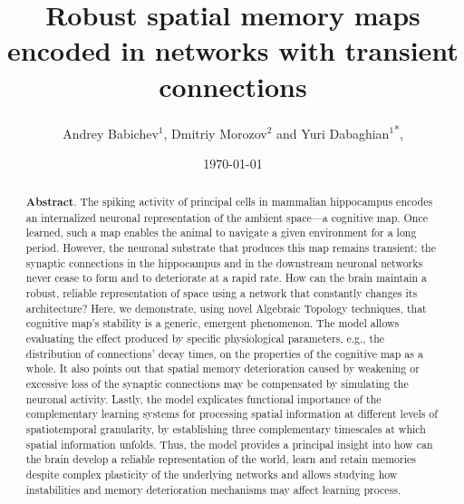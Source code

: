 \documentclass[12pt,tightenlines]{revtex4}
\begin{document}
\title{Robust spatial memory maps encoded in networks with transient connections}
\author{Andrey Babichev$^{1}$, Dmitriy Morozov$^{2}$ and Yuri Dabaghian$^{1}$\textsuperscript{*},}
\date{\today}

\begin{abstract} 
\vspace{10 mm}

\textbf{Abstract}. The spiking activity of principal cells in mammalian hippocampus encodes an internalized 
neuronal representation of the ambient space---a cognitive map. Once learned, such a map enables the animal 
to navigate a given environment for a long period. However, the neuronal substrate that produces this map remains 
transient: the synaptic connections in the hippocampus and in the downstream neuronal networks never cease to 
form and to deteriorate at a rapid rate. How can the brain maintain a robust, reliable representation of space using 
a network that constantly changes its architecture? Here, we demonstrate, using novel Algebraic Topology techniques, 
that cognitive map’s stability is a generic, emergent phenomenon. The model allows evaluating the effect produced by 
specific physiological parameters, e.g., the distribution of connections' decay times, on the properties of the cognitive 
map as a whole. It also points out that spatial memory deterioration caused by weakening or excessive loss of the 
synaptic connections may be compensated by simulating the neuronal activity. Lastly, the model explicates functional 
importance of the complementary learning systems for processing spatial information at different levels of spatiotemporal 
granularity, by establishing three complementary timescales at which spatial information unfolds. Thus, the model 
provides a principal insight into how can the brain develop a reliable representation of the world, learn and retain 
memories despite complex plasticity of the underlying networks and allows studying how instabilities and memory 
deterioration mechanisms may affect learning process.

\vspace{10 mm}


\end{abstract}
\end{document}
